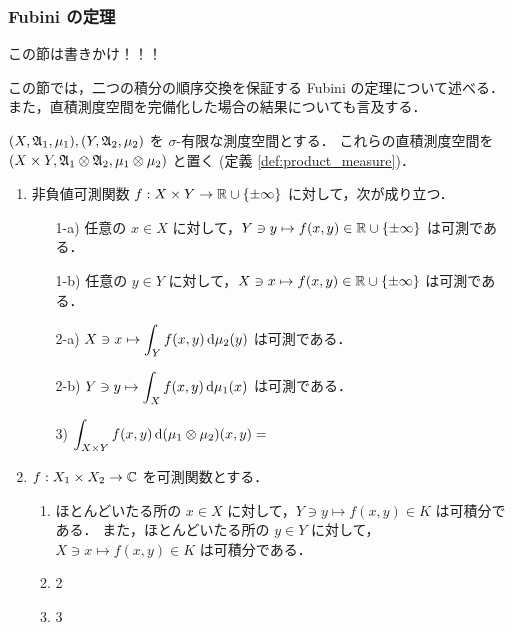\subsubsection{Fubini の定理}

{\color{red}この節は書きかけ！！！}

この節では，二つの積分の順序交換を保証する Fubini の定理について述べる．
また，直積測度空間を完備化した場合の結果についても言及する．

\begin{theorem}[Fubini]
    $(X,\mathfrak{A}_1,\mu_1),(Y,\mathfrak{A}_2,\mu_2)$ を $\sigma$-有限な測度空間とする．
    これらの直積測度空間を $(X\times Y,\mathfrak{A}_1\otimes\mathfrak{A}_2,\mu_1\otimes\mu_2)$ と置く (定義 \ref{def:product_measure})．
    \begin{enumerate}
        \item 非負値可測関数 $f:X\times Y\to\mathbb{R}\cup\{\pm\infty\}$ に対して，次が成り立つ．
            \begin{enumerate}
                \item[1-a)] 任意の $x\in X$ に対して，$Y\ni y\mapsto f(x,y)\in\mathbb{R}\cup\{\pm\infty\}$ は可測である．
                \item[1-b)] 任意の $y\in Y$ に対して，$X\ni x\mapsto f(x,y)\in\mathbb{R}\cup\{\pm\infty\}$ は可測である．
                \item[2-a)] $\displaystyle X\ni x\mapsto\int_Yf(x,y)\,\mathrm{d}\mu_2(y)$ は可測である．
                \item[2-b)] $\displaystyle Y\ni y\mapsto\int_Xf(x,y)\,\mathrm{d}\mu_1(x)$ は可測である．
                \item[3)]
                    $\displaystyle
                        \int_{X\times Y}f(x,y)\,\mathrm{d}(\mu_1\otimes\mu_2)(x,y)
                        =
                    $
            \end{enumerate}
        \item
            $f:X_1\times X_2\to\mathbb{C}$ を可測関数とする．
            \begin{enumerate}
                \item
                    ほとんどいたる所の $x\in X$ に対して，$Y\ni y\mapsto f(x,y)\in K$ は可積分である．
                    また，ほとんどいたる所の $y\in Y$ に対して，$X\ni x\mapsto f(x,y)\in K$ は可積分である．
                \item 2
                \item 3
            \end{enumerate}
    \end{enumerate}
\end{theorem}
